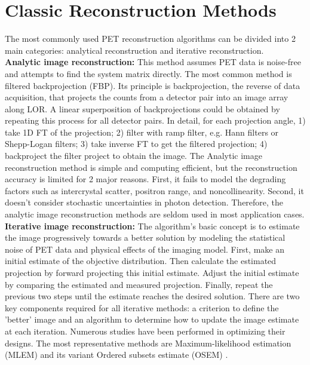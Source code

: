 \documentclass[11pt,a4paper]{article}
\begin{document}
    \section{Classic Reconstruction Methods}
    \label{sec:method}
    The most commonly used PET reconstruction algorithms can be divided into 2 main categories: analytical reconstruction and iterative reconstruction. \\
    \textbf{Analytic image reconstruction:} This method assumes PET data is noise-free and attempts to find the system matrix directly. 
    The most common method is filtered backprojection (FBP). Its principle is backprojection, the reverse of data acquisition, that projects the counts from a detector pair into an image array along LOR. A linear superposition of backprojections could be obtained by repeating this process for all detector pairs. In detail, for each projection angle, 1) take 1D FT of the projection; 2) filter with ramp filter, e.g. Hann filters or Shepp-Logan filters; 3) take inverse FT to get the filtered projection; 4) backproject the filter project to obtain the image. The Analytic image reconstruction method is simple and computing efficient, but the reconstruction accuracy is limited for 2 major reasons. First, it fails to model the degrading factors such as intercrystal scatter, positron range, and noncollinearity. Second, it doesn't consider stochastic uncertainties in photon detection. Therefore, the analytic image reconstruction methods are seldom used in most application cases.\\
    \textbf{Iterative image reconstruction:} The algorithm's basic concept is to estimate the image progressively towards a better solution by modeling the statistical noise of PET data and physical effects of the imaging model. First, make an initial estimate of the objective distribution. Then calculate the estimated projection by forward projecting this initial estimate. Adjust the initial estimate by comparing the estimated and measured projection. Finally, repeat the previous two steps until the estimate reaches the desired solution. There are two key components required for all iterative methods: a criterion to define the 'better' image and an algorithm to determine how to update the image estimate at each iteration. Numerous studies have been performed in optimizing their designs. The most representative methods are Maximum-likelihood estimation (MLEM) and its variant Ordered subsets estimate (OSEM) \cite{tong2010petctreview}.\\
\end{document}
